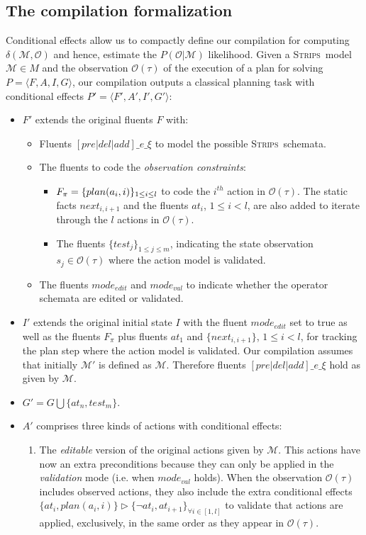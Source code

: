 \documentclass[letterpaper]{article} %
\newcommand{\tup}[1]{{\langle #1 \rangle}}
\newcommand{\strips}{\textsc{Strips}}     %
\begin{document}
\subsection{The compilation formalization}
Conditional effects allow us to compactly define our compilation for computing $\delta(\mathcal{M},\mathcal{O})$ and hence, estimate the $P(\mathcal{O}|\mathcal{M})$ likelihood. Given a \strips\ model $\mathcal{M}\in M$ and the observation $\mathcal{O}(\tau)$ of the execution of a plan for solving $P=\tup{F,A,I,G}$, our compilation outputs a classical planning task with conditional effects $P'=\tup{F',A',I',G'}$:
\begin{itemize}
\item $F'$ extends the original fluents $F$ with:
\begin{itemize}
\item Fluents $[pre|del|add]\_e\_\xi$ to model the possible \strips\ schemata. 
\item The fluents to code the {\em observation constraints}:
\begin{itemize}
\item $F_{\pi}=\{plan(a_i,i)\}_{\small 1\leq i\leq l}$ to code the $i^{th}$ action in $\mathcal{O}(\tau)$. The static facts $next_{i,i+1}$ and the fluents $at_i$, {\small $1\leq i< l$}, are also added to iterate through the $l$ actions in $\mathcal{O}(\tau)$.
\item The fluents $\{test_j\}_{1\leq j\leq m}$, indicating the state observation $s_j\in\mathcal{O}(\tau)$ where the action model is validated.
\end{itemize}
\item The fluents $mode_{edit}$ and $mode_{val}$ to indicate whether the operator schemata are edited or validated.
\end{itemize}
\item $I'$ extends the original initial state $I$ with the fluent $mode_{edit}$ set to true as well as the fluents $F_{\pi}$ plus fluents $at_1$ and $\{next_{i,i+1}\}$, {\small $1\leq i<l$}, for tracking the plan step where the action model is validated. Our compilation assumes that initially $\mathcal{M}'$ is defined as $\mathcal{M}$. Therefore fluents $[pre|del|add]\_e\_\xi$ hold as given by $\mathcal{M}$.

\item $G'=G\bigcup\{at_n,test_m\}$.
\item $A'$ comprises three kinds of actions with conditional effects:
\begin{enumerate}
\item The {\em editable} version of the original actions given by $\mathcal{M}$. This actions have now an extra preconditions because they can only be applied in the {\em validation} mode (i.e. when $mode_{val}$ holds). When the observation $\mathcal{O}(\tau)$ includes observed actions, they also include the extra conditional effects $\{at_{i},plan(a_i,i)\}\rhd\{\neg at_{i},at_{i+1}\}_{\forall i\in [1,l]}$ to validate that actions are applied, exclusively, in the same order as they appear in $\mathcal{O}(\tau)$.\\


\end{enumerate}
\end{itemize}
\end{document}
